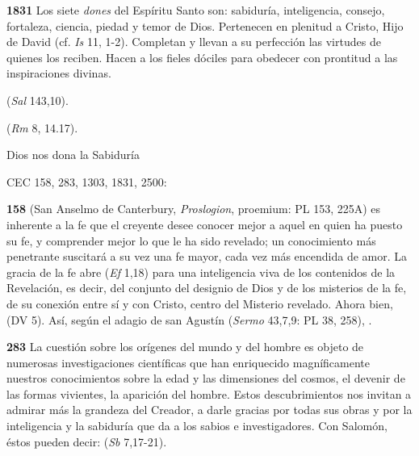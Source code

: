\begin{body}
\begin{body}
\textbf{1831} Los siete \emph{dones} del Espíritu Santo son: sabiduría, inteligencia, consejo, fortaleza, ciencia, piedad y temor de Dios. Pertenecen en plenitud a Cristo, Hijo de David (cf. \emph{Is} 11, 1-2). Completan y llevan a su perfección las virtudes de quienes los reciben. Hacen a los fieles dóciles para obedecer con prontitud a las inspiraciones divinas.

 (\emph{Sal} 143,10).

 (\emph{Rm} 8, 14.17).

Dios nos dona la Sabiduría

CEC 158, 283, 1303, 1831, 2500:

\textbf{158}  (San Anselmo de Canterbury, \emph{Proslogion}, proemium: PL 153, 225A) es inherente a la fe que el creyente desee conocer mejor a aquel en quien ha puesto su fe, y comprender mejor lo que le ha sido revelado; un conocimiento más penetrante suscitará a su vez una fe mayor, cada vez más encendida de amor. La gracia de la fe abre  (\emph{Ef} 1,18) para una inteligencia viva de los contenidos de la Revelación, es decir, del conjunto del designio de Dios y de los misterios de la fe, de su conexión entre sí y con Cristo, centro del Misterio revelado. Ahora bien,  (DV 5). Así, según el adagio de san Agustín (\emph{Sermo} 43,7,9: PL 38, 258), .

\textbf{283} La cuestión sobre los orígenes del mundo y del hombre es objeto de numerosas investigaciones científicas que han enriquecido magníficamente nuestros conocimientos sobre la edad y las dimensiones del cosmos, el devenir de las formas vivientes, la aparición del hombre. Estos descubrimientos nos invitan a admirar más la grandeza del Creador, a darle gracias por todas sus obras y por la inteligencia y la sabiduría que da a los sabios e investigadores. Con Salomón, éstos pueden decir:  (\emph{Sb} 7,17-21).


\end{body}
\end{body}
